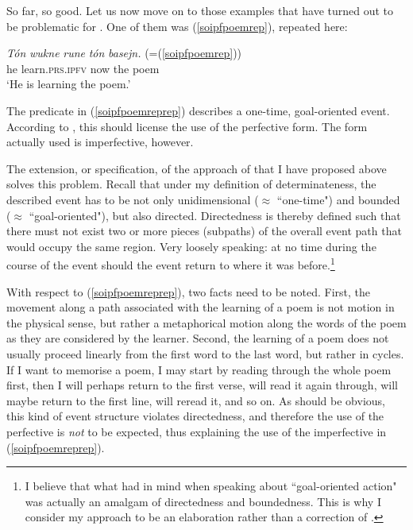 \documentclass[output=paper,colorlinks,citecolor=brown]{langscibook}
\begin{document}
So far, so good. Let us now move on to those examples that have turned out to be problematic for \citet{Toops2001}. 
One of them was (\ref{soipfpoemrep}), repeated here: 

  \ea\label{soipfpoemreprep}
\gll \textit{T\'on} \textit{wukne} \textit{rune} \textit{t\'on} \textit{basejn.} (=(\ref{soipfpoemrep}))\\
he learn.\textsc{prs.ipfv} now the poem\\
\glt \normalsize{`He is learning the poem.'}
\z

\noindent The predicate in (\ref{soipfpoemreprep}) describes a one-time, goal-oriented event. According to \citet{Toops2001},
this should license the use of the perfective form. The form actually used is imperfective, however.

The extension, or specification, of the approach of \citet{Toops2001} that I have proposed above solves this problem. Recall that under my definition of determinateness, the described event has to be not only unidimensional ($\approx$ ``one-time") and bounded ($\approx$ ``goal-oriented"), but also directed. Directedness is thereby defined such that there must not exist two or more pieces (subpaths) of the overall event path that would occupy the same region. Very loosely speaking: at no time during the course of the event should the event return to where it was before.\footnote{I believe that what \citet{Toops2001} had in mind when speaking about ``goal-oriented action" was actually an amalgam of directedness and boundedness. This is why I consider my approach to be an elaboration rather than a correction of \citet{Toops2001}.} 

With respect to (\ref{soipfpoemreprep}), two facts need to be noted. First, the movement along a path associated with the learning of a poem is not motion in the physical sense, but rather a metaphorical motion along the words of the poem as they are considered by the learner. Second, the learning of a poem does not usually proceed linearly from the first word to the last word, but rather in cycles. If I want to memorise a poem, I may start by reading through the whole poem first, then I will perhaps return to the first verse, will read it again through, will maybe return to the first line, will reread it, and so on. As should be obvious, this kind of event structure violates directedness, and therefore the use of the perfective is \textit{not} to be expected, thus explaining the use of the imperfective in (\ref{soipfpoemreprep}).  
\end{document}

